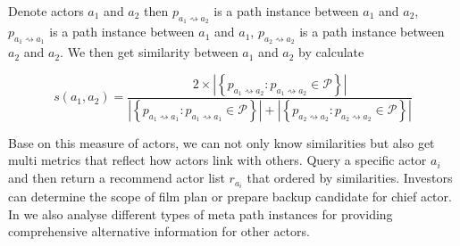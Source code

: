 Denote actors $a_1$ and $a_2$ then $p_{a_1 \rightsquigarrow a_2}$ is a path instance between $a_1$ and $a_2$, $p_{a_1 \rightsquigarrow a_1}$ is a path instance between $a_1$ and $a_1$, $p_{a_2 \rightsquigarrow a_2}$ is a path instance between $a_2$ and $a_2$. We then get similarity between $a_1$ and $a_2$ by calculate

\begin{equation}
  s(a_1,a_2) = \frac{2 \times |\left\{p_{a_1 \rightsquigarrow a_2}: p_{a_1 \rightsquigarrow a_2} \in \mathcal{P} \right\}|}{|\left\{p_{a_1 \rightsquigarrow a_1}: p_{a_1 \rightsquigarrow a_1} \in \mathcal{P} \right\}| + |\left\{p_{a_2 \rightsquigarrow a_2}: p_{a_2 \rightsquigarrow a_2} \in \mathcal{P} \right\}|}
\end{equation}

Base on this measure of actors, we can not only know similarities but also get multi metrics that reflect how actors link with others. Query a specific actor $a_i$and then return a recommend actor list $r_{a_i}$ that ordered by similarities. Investors can determine the scope of film plan or prepare backup candidate for chief actor. In \system we also analyse different types of meta path instances for providing comprehensive alternative information for other actors.
 